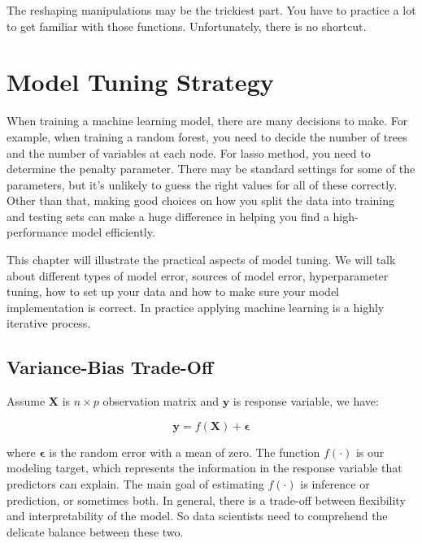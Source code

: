 \documentclass[12pt,]{krantz}
\begin{document}
The reshaping manipulations may be the trickiest part. You have to practice a lot to get familiar with those functions. Unfortunately, there is no shortcut.

\hypertarget{modeltuningstrategy}{%
\chapter{Model Tuning Strategy}\label{modeltuningstrategy}}

When training a machine learning model, there are many decisions to make. For example, when training a random forest, you need to decide the number of trees and the number of variables at each node. For lasso method, you need to determine the penalty parameter. There may be standard settings for some of the parameters, but it's unlikely to guess the right values for all of these correctly. Other than that, making good choices on how you split the data into training and testing sets can make a huge difference in helping you find a high-performance model efficiently.

This chapter will illustrate the practical aspects of model tuning. We will talk about different types of model error, sources of model error, hyperparameter tuning, how to set up your data and how to make sure your model implementation is correct. In practice applying machine learning is a highly iterative process.

\hypertarget{vbtradeoff}{%
\section{Variance-Bias Trade-Off}\label{vbtradeoff}}

Assume \(\mathbf{X}\) is \(n \times p\) observation matrix and \(\mathbf{y}\) is response variable, we have:

\begin{equation}
\mathbf{y}=f(\mathbf{X})+\symbf{\epsilon}
\label{eq:generalmodeleq}
\end{equation}

where \(\symbf{\epsilon}\) is the random error with a mean of zero. The function \(f(\cdot)\) is our modeling target, which represents the information in the response variable that predictors can explain. The main goal of estimating \(f(\cdot)\) is inference or prediction, or sometimes both. In general, there is a trade-off between flexibility and interpretability of the model. So data scientists need to comprehend the delicate balance between these two.
\end{document}
